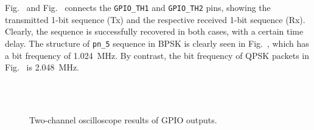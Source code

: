 \documentclass[journal,twoside]{IEEEtran}
\begin{document}
    Fig.~ and Fig.~
    connects the \texttt{GPIO\_TH1} and \texttt{GPIO\_TH2} pins,
    showing the transmitted 1-bit sequence (Tx) and the respective received 1-bit sequence (Rx).
    Clearly, the sequence is successfully recovered in both cases, with a certain time delay.
    The structure of \texttt{pn\_5} sequence in BPSK is clearly seen in Fig.~,
    which has a bit frequency of \qty{1.024}{MHz}.
    By contrast, the bit frequency of QPSK packets in Fig.~ is \qty{2.048}{MHz}.



    \begin{figure}[t]
      \centering
      \\
      \\
      \caption{Two-channel oscilloscope results of GPIO outputs.}
      \label{fig:scope}
    \end{figure}
\end{document}
